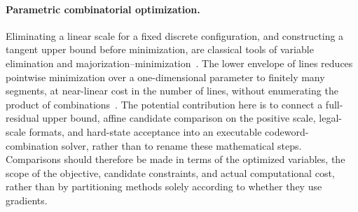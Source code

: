\paragraph{Parametric combinatorial optimization.}
Eliminating a linear scale for a fixed discrete configuration, and constructing a tangent upper bound before minimization, are classical tools of variable elimination and majorization--minimization~\cite{mmreview,mmtutorial}.
The lower envelope of lines reduces pointwise minimization over a one-dimensional parameter to finitely many segments, at near-linear cost in the number of lines, without enumerating the product of combinations~\cite{computationalgeometry}.
The potential contribution here is to connect a full-residual upper bound, affine candidate comparison on the positive scale, legal-scale formats, and hard-state acceptance into an executable codeword-combination solver, rather than to rename these mathematical steps.
Comparisons should therefore be made in terms of the optimized variables, the scope of the objective, candidate constraints, and actual computational cost, rather than by partitioning methods solely according to whether they use gradients.
